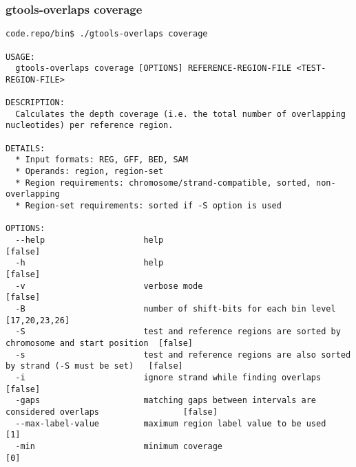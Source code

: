 \subsubsection{gtools-overlaps coverage}\label{gtools-overlaps_coverage}
\begin{lstlisting}
code.repo/bin$ ./gtools-overlaps coverage

USAGE:
  gtools-overlaps coverage [OPTIONS] REFERENCE-REGION-FILE <TEST-REGION-FILE>

DESCRIPTION:
  Calculates the depth coverage (i.e. the total number of overlapping nucleotides) per reference region.

DETAILS:
  * Input formats: REG, GFF, BED, SAM
  * Operands: region, region-set
  * Region requirements: chromosome/strand-compatible, sorted, non-overlapping
  * Region-set requirements: sorted if -S option is used

OPTIONS:
  --help                    help                                                                    [false]
  -h                        help                                                                    [false]
  -v                        verbose mode                                                            [false]
  -B                        number of shift-bits for each bin level                                 [17,20,23,26]
  -S                        test and reference regions are sorted by chromosome and start position  [false]
  -s                        test and reference regions are also sorted by strand (-S must be set)   [false]
  -i                        ignore strand while finding overlaps                                    [false]
  -gaps                     matching gaps between intervals are considered overlaps                 [false]
  --max-label-value         maximum region label value to be used                                   [1]
  -min                      minimum coverage                                                        [0]
\end{lstlisting}
%
